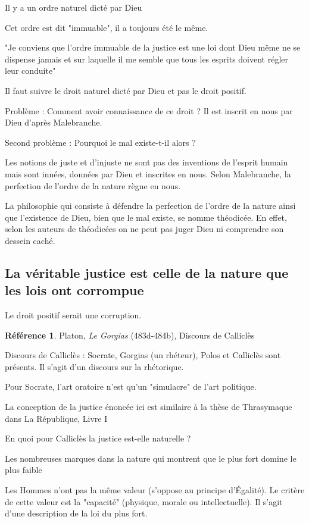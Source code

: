 \documentclass[french]{book}
\theoremstyle{definition}
\newtheorem*{refe}{Référence}
\begin{document}
Il y a un ordre naturel dicté par Dieu

Cet ordre est dit "immuable", il a toujours été le même.

"Je conviens que l'ordre immuable de la justice est une loi dont Dieu même ne se dispense jamais et sur laquelle il me semble que tous les esprits doivent régler leur conduite"

Il faut suivre le droit naturel dicté par Dieu et pas le droit positif.

Problème : Comment avoir connaissance de ce droit ?
Il est inscrit en nous par Dieu d'après Malebranche.

Second problème : Pourquoi le mal existe-t-il alors ?

Les notions de juste et d'injuste ne sont pas des inventions de l'esprit humain mais sont innées, données par Dieu et inscrites en nous.
Selon Malebranche, la perfection de l'ordre de la nature règne en nous.

La philosophie qui consiste à défendre la perfection de l'ordre de la nature ainsi que l'existence de Dieu, bien que le mal existe, se nomme théodicée.
En effet, selon les auteurs de théodicées on ne peut pas juger Dieu ni comprendre son dessein caché.

\subsection{La véritable justice est celle de la nature que les lois ont corrompue}

Le droit positif serait une corruption.

\begin{refe}
	Platon, \textit{Le Gorgias} (483d-484b), Discours de Calliclès
\end{refe}

Discours de Calliclès : Socrate, Gorgias (un rhéteur), Polos et Calliclès sont présents. Il s'agit d'un discours sur la rhétorique.

Pour Socrate, l'art oratoire n'est qu'un "simulacre" de l'art politique.

La conception de la justice énoncée ici est similaire à la thèse de Thrasymaque dans La République, Livre I

En quoi pour Calliclès la justice est-elle naturelle ?

Les nombreuses marques dans la nature qui montrent que le plus fort domine le plus faible

Les Hommes n'ont pas la même valeur (s'oppose au principe d'Égalité). Le critère de cette valeur est la "capacité" (physique, morale ou intellectuelle). Il s'agit d'une description de la loi du plus fort.
\end{document}
